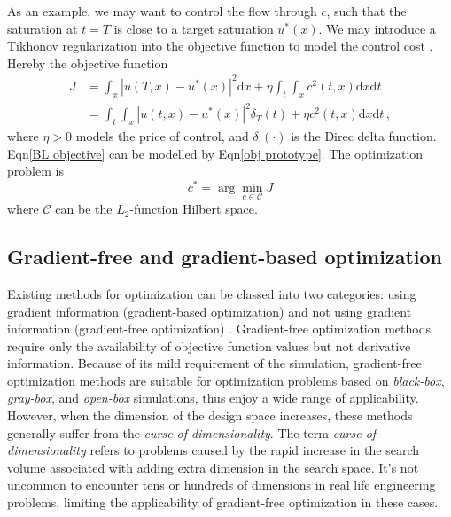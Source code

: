 \documentclass[a4paper,onecolumn]{article}
\theoremstyle{remark}
\begin{document}
\noindent As an example, we may
want to control the flow through $c$, such that the saturation at $t=T$ is close to 
a target saturation $u^*(x)$. We may introduce a Tikhonov regularization into the objective function 
to model the control cost \cite{Boyd optimization}.
Hereby the objective function
\begin{equation}\begin{split}
    J &= \int_x \left|u(T,x) - u^*(x)\right|^2 \textrm{d}x + \eta \int_t\int_x  c^2(t,x) \textrm{d}x\textrm{d}t\\
      &= \int_t \int_x \left|u(t,x) - u^*(x)\right|^2 \delta_T(t) + \eta c^2(t,x) \textrm{d}x \textrm{d}t \,,
\end{split} \label{BL objective}
\end{equation}
where $\eta>0$ models the price of control, and $\delta_\cdot(\cdot)$ is the Direc delta function.
Eqn\eqref{BL objective} can be modelled by Eqn\eqref{obj prototype}.
The optimization problem is
\begin{equation}
    c^* = \arg\min_{c\in \mathcal{C}} J
\end{equation}
where $\mathcal{C}$ can be the $L_2$-function Hilbert space.\\

\subsection{Gradient-free and gradient-based optimization}
\label{gradfree_gradbased}
\noindent Existing methods for optimization can be classed into two categories: 
using gradient information (gradient-based optimization) and not using gradient information (gradient-free optimization)
\cite{hanmaster, Opt Koziel Book}.
Gradient-free optimization methods require only the availability of objective function values but
not derivative information\cite{gradfreereview}. Because of its mild requirement of the simulation, 
gradient-free optimization methods are suitable for optimization problems based
on \textit{black-box}, \textit{gray-box}, and \textit{open-box} simulations, 
thus enjoy a wide range of applicability. However, when the dimension of the design space 
increases, these methods generally suffer from the \textit{curse of dimensionality}.
The term \textit{curse of dimensionality} refers to problems caused by the rapid increase in the search volume associated
with adding extra dimension in the search space\cite{dynamicprogramming}. It's not uncommon to encounter
tens or hundreds of dimensions in real life engineering problems, 
limiting the applicability of gradient-free optimization
in these cases.\\
\end{document}
